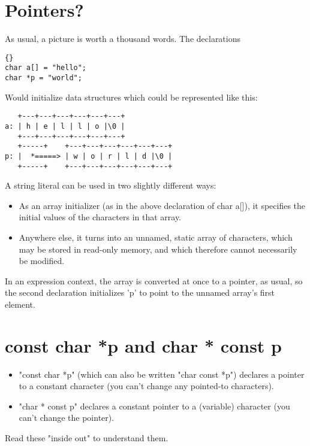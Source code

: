 \documentclass{report}
\begin{document}
\section{Pointers?}
As usual, a picture is worth a thousand words.  The declarations
\begin{lstlisting}{}
char a[] = "hello";
char *p = "world";
\end{lstlisting}
Would initialize data structures which could be represented like this:
\begin{verbatim}
   +---+---+---+---+---+---+
a: | h | e | l | l | o |\0 |
   +---+---+---+---+---+---+
   +-----+    +---+---+---+---+---+---+
p: |  *=====> | w | o | r | l | d |\0 |
   +-----+    +---+---+---+---+---+---+
\end{verbatim}
A string literal can be used in two slightly different ways:
\begin{itemize}
\item As an array initializer (as in the above declaration of char a[]), it specifies the initial values of the characters in that array.
\item Anywhere else, it turns into an unnamed, static array of characters, which may be stored in read-only memory, and which therefore cannot necessarily be modified.
\end{itemize}	
In an expression context, the array is converted at once to a pointer, as usual, so the second declaration initializes 'p' to point to the unnamed array's first element.



\section{const char *p and char * const p}
\begin{itemize}
\item "const char *p" (which can also be written "char const *p") declares a pointer to a constant character (you can't change any pointed-to characters).
\item "char * const p" declares a constant pointer to a (variable) character (you can't change the
pointer).
\end{itemize}
Read these "inside out" to understand them.
	
\end{document}
